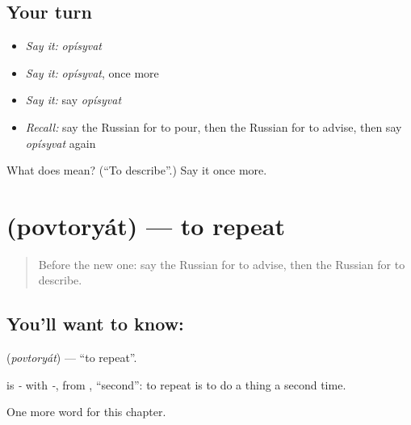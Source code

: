 \subsection*{Your turn}
\begin{itemize}
\raggedright
  \item \emph{Say it:} \emph{opísyvat}
  \item \emph{Say it:} \emph{opísyvat}, once more
  \item \emph{Say it:} say \emph{opísyvat}
  \item \emph{Recall:} say the Russian for to pour, then the Russian for to advise, then say \emph{opísyvat} again
\end{itemize}

\begin{tcolorbox}[breakable,colback=teal!4,colframe=teal!35!black,title={Before you move on}]
What does  mean? (\textquotedblleft{}To describe\textquotedblright{}.) Say it once more.
\end{tcolorbox}
\section[\texorpdfstring{\ru{повторять} (povtoryát)}{повторять (povtoryát)}]{ (povtoryát) — to repeat}

\label{lesson:RU-C174-povtoryat}



\begin{quote}
Before the new one: say the Russian for to advise, then the Russian for to describe.
\end{quote}

\subsection*{You'll want to know: }
\textbf{} (\emph{povtoryát}) — \textquotedblleft{}to repeat\textquotedblright{}.

\begin{cousinweb}
\textbf{} is \emph{-} with \emph{-}, from \emph{}, \textquotedblleft{}second\textquotedblright{}: to repeat is to do a thing a second time.
\end{cousinweb}

\begin{grammarlens}[title={What you've built}]
One more word for this chapter.
\end{grammarlens}

